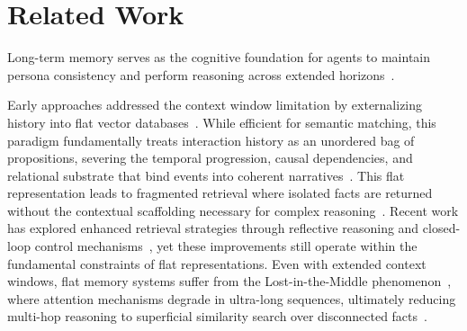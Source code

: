 



\section{Related Work} \label{Related Work}
Long-term memory serves as the cognitive foundation for agents to maintain persona consistency and perform reasoning across extended horizons~\cite{maharana2024evaluating,wu2024longmemeval,dong2025towards,huang2025licomemory}.
 
Early approaches addressed the context window limitation by externalizing history into flat vector databases~\cite{park2023generative,packer2023memgpt,zhong2024memorybank}. While efficient for semantic matching, this paradigm fundamentally treats interaction history as an unordered bag of propositions, severing the temporal progression, causal dependencies, and relational substrate that bind events into coherent narratives~\cite{gao2023retrieval, Liu2023LostIT}. This flat representation leads to fragmented retrieval where isolated facts are returned without the contextual scaffolding necessary for complex reasoning~\cite{weller2025theoreticallimitationsembeddingbasedretrieval,li2025sculptorempoweringllmscognitive}. Recent work has explored enhanced retrieval strategies through reflective reasoning and closed-loop control mechanisms~\cite{du2025memr3memoryretrievalreflective}, yet these improvements still operate within the fundamental constraints of flat representations. Even with extended context windows, flat memory systems suffer from the Lost-in-the-Middle phenomenon~\cite{Liu2023LostIT}, where attention mechanisms degrade in ultra-long sequences, ultimately reducing multi-hop reasoning to superficial similarity search over disconnected facts~\cite{zhuang2025linearrag}.

